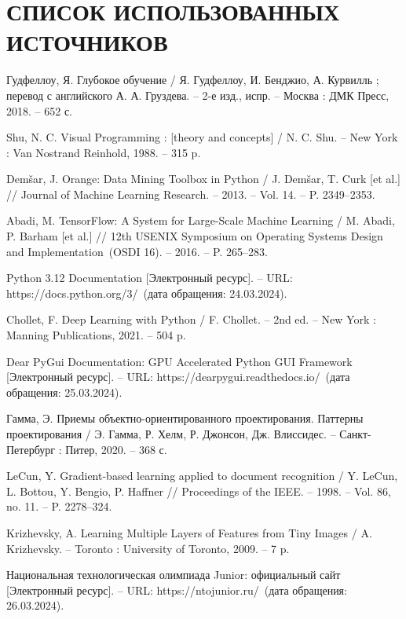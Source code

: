 \documentclass{report}
\begin{document}
\chapter*{СПИСОК ИСПОЛЬЗОВАННЫХ ИСТОЧНИКОВ}
\begin{thebibliography}{}

    Гудфеллоу, Я. Глубокое обучение / Я. Гудфеллоу, И. Бенджио, А. Курвилль ; перевод с английского А. А. Груздева. – 2-е изд., испр. – Москва : ДМК Пресс, 2018. – 652 с.

    Shu, N. C. Visual Programming : [theory and concepts] / N. C. Shu. – New York : Van Nostrand Reinhold, 1988. – 315 p.

    Demšar, J. Orange: Data Mining Toolbox in Python / J. Demšar, T. Curk [et al.] // Journal of Machine Learning Research. – 2013. – Vol. 14. – P. 2349–2353.

    Abadi, M. TensorFlow: A System for Large-Scale Machine Learning / M. Abadi, P. Barham [et al.] // 12th USENIX Symposium on Operating Systems Design and Implementation~(OSDI 16). – 2016. – P. 265–283.

    Python 3.12 Documentation [Электронный ресурс]. – URL: https://docs.python.org/3/~(дата обращения: 24.03.2024).

    Chollet, F. Deep Learning with Python / F. Chollet. – 2nd ed. – New York : Manning Publications, 2021. – 504 p.

    Dear PyGui Documentation: GPU Accelerated Python GUI Framework [Электронный ресурс]. – URL: https://dearpygui.readthedocs.io/~(дата обращения: 25.03.2024).

    Гамма, Э. Приемы объектно-ориентированного проектирования. Паттерны проектирования / Э. Гамма, Р. Хелм, Р. Джонсон, Дж. Влиссидес. – Санкт-Петербург : Питер, 2020. – 368 с.

    LeCun, Y. Gradient-based learning applied to document recognition / Y. LeCun, L. Bottou, Y. Bengio, P. Haffner // Proceedings of the IEEE. – 1998. – Vol. 86, no. 11. – P. 2278–324.

    Krizhevsky, A. Learning Multiple Layers of Features from Tiny Images / A. Krizhevsky. – Toronto : University of Toronto, 2009. – 7 p.

    Национальная технологическая олимпиада Junior: официальный сайт [Электронный ресурс]. – URL: https://ntojunior.ru/~(дата обращения: 26.03.2024).

\end{thebibliography}
\end{document}
